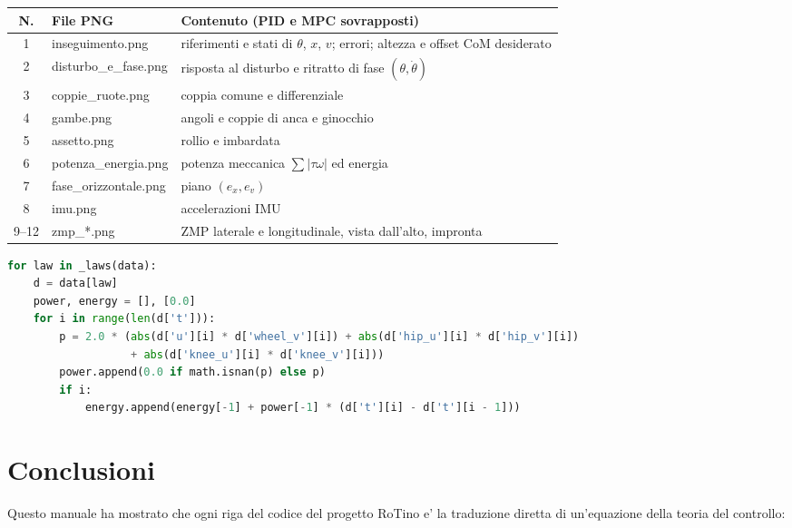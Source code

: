 \documentclass[11pt,a4paper]{report}
\begin{document}
\begin{center}
\begin{tabular}{clp{8cm}}
\toprule
\textbf{N.} & \textbf{File PNG} & \textbf{Contenuto (PID e MPC sovrapposti)} \\
\midrule
1 & inseguimento.png & riferimenti e stati di $\theta$, $x$, $v$; errori; altezza e offset CoM desiderato \\
2 & disturbo\_e\_fase.png & risposta al disturbo e ritratto di fase $(\theta, \dot\theta)$ \\
3 & coppie\_ruote.png & coppia comune e differenziale \\
4 & gambe.png & angoli e coppie di anca e ginocchio \\
5 & assetto.png & rollio e imbardata \\
6 & potenza\_energia.png & potenza meccanica $\sum|\tau\omega|$ ed energia \\
7 & fase\_orizzontale.png & piano $(e_x, e_v)$ \\
8 & imu.png & accelerazioni IMU \\
9--12 & zmp\_*.png & ZMP laterale e longitudinale, vista dall'alto, impronta \\
\bottomrule
\end{tabular}
\end{center}

\begin{lstlisting}[language=Python, caption=plot.py: potenza meccanica ed energia]
for law in _laws(data):
    d = data[law]
    power, energy = [], [0.0]
    for i in range(len(d['t'])):
        p = 2.0 * (abs(d['u'][i] * d['wheel_v'][i]) + abs(d['hip_u'][i] * d['hip_v'][i])
                   + abs(d['knee_u'][i] * d['knee_v'][i]))
        power.append(0.0 if math.isnan(p) else p)
        if i:
            energy.append(energy[-1] + power[-1] * (d['t'][i] - d['t'][i - 1]))
\end{lstlisting}

\chapter{Conclusioni}

Questo manuale ha mostrato che ogni riga del codice del progetto RoTino
e' la traduzione diretta di un'equazione della teoria del controllo:
\end{document}
